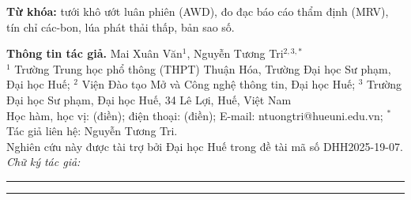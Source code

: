 \textbf{Từ khóa:} tưới khô ướt luân phiên (AWD), đo đạc báo cáo thẩm định
(MRV), tín chỉ các-bon, lúa phát thải thấp, bản sao số.

\vspace{4pt}

{\raggedright\normalfont\fontsize{9}{11}\selectfont
\textbf{Thông tin tác giả.} Mai Xuân Văn$^{1}$, Nguyễn Tương Tri$^{2,3,*}$\\[1pt]
$^{1}$ Trường Trung học phổ thông (THPT) Thuận Hóa, Trường Đại học Sư phạm, Đại học Huế;
$^{2}$ Viện Đào tạo Mở và Công nghệ thông tin, Đại học Huế;
$^{3}$ Trường Đại học Sư phạm, Đại học Huế, 34 Lê Lợi, Huế, Việt Nam\\[1pt]
Học hàm, học vị: (điền); điện thoại: (điền); E-mail: ntuongtri@hueuni.edu.vn;
$^{*}$ Tác giả liên hệ: Nguyễn Tương Tri.\\[2pt]
Nghiên cứu này được tài trợ bởi Đại học Huế trong đề tài mã số DHH2025-19-07.
\hfill\textit{Chữ ký tác giả:} \rule{3.5cm}{0.4pt}\hfill\rule{3.5cm}{0.4pt}\hspace*{\fill}
\par}
